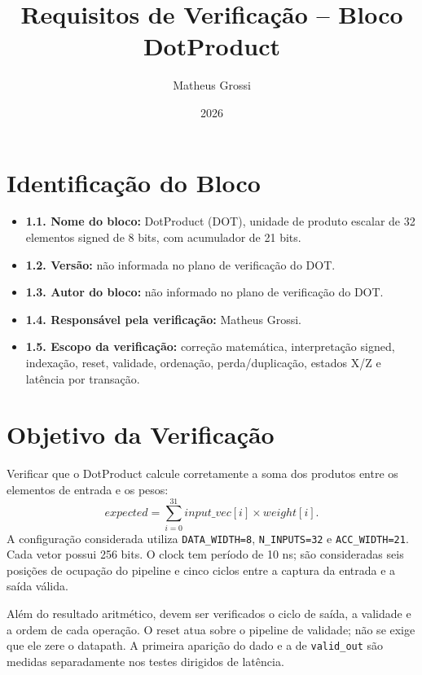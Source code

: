\documentclass[12pt,a4paper]{article}
\title{Requisitos de Verificação -- Bloco DotProduct}
\author{Matheus Grossi}
\date{2026}
\begin{document}
\maketitle
\vspace{1.5cm}
\section{Identificação do Bloco}
\begin{itemize}[label=\textbullet]
\item \textbf{1.1. Nome do bloco:} DotProduct (DOT), unidade de produto escalar de 32 elementos signed de 8 bits, com acumulador de 21 bits.
\item \textbf{1.2. Versão:} não informada no plano de verificação do DOT.
\item \textbf{1.3. Autor do bloco:} não informado no plano de verificação do DOT.
\item \textbf{1.4. Responsável pela verificação:} Matheus Grossi.
\item \textbf{1.5. Escopo da verificação:} correção matemática, interpretação signed, indexação, reset, validade, ordenação, perda/duplicação, estados X/Z e latência por transação.
\end{itemize}

\section{Objetivo da Verificação}
Verificar que o DotProduct calcule corretamente a soma dos produtos entre os elementos de entrada e os pesos:
\[
expected=\sum_{i=0}^{31} input\_vec[i]\times weight[i].
\]
A configuração considerada utiliza \texttt{DATA\_WIDTH=8}, \texttt{N\_INPUTS=32} e \texttt{ACC\_WIDTH=21}. Cada vetor possui 256 bits. O clock tem período de 10 ns; são consideradas seis posições de ocupação do pipeline e cinco ciclos entre a captura da entrada e a saída válida.

Além do resultado aritmético, devem ser verificados o ciclo de saída, a validade e a ordem de cada operação. O reset atua sobre o pipeline de validade; não se exige que ele zere o datapath. A primeira aparição do dado e a de \texttt{valid\_out} são medidas separadamente nos testes dirigidos de latência.
\end{document}
